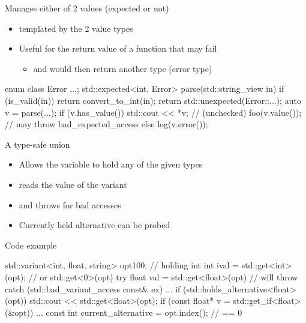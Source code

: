 \begin{frame}[fragile]
  \begin{block}{Manages either of 2 values (expected or not)}
    \begin{itemize}
    \item templated by the 2 value types
    \item Useful for the return value of a function that may fail
      \begin{itemize}
      \item and would then return another type (error type)
      \end{itemize}
    \end{itemize}
  \end{block}
  \begin{exampleblock}{}
    \small
    \begin{cppcode*}{}
      enum class Error {...};
      std::expected<int, Error> parse(std::string_view in) {
        if (is_valid(in)) return convert_to_int(in);
        return std::unexpected(Error::...);
      }
      auto v = parse(...);
      if (v.has_value()) {
        std::cout << *v; // (unchecked)
        foo(v.value());  // may throw bad_expected_access
      } else
        log(v.error());
    \end{cppcode*}
  \end{exampleblock}
\end{frame}

\begin{frame}[fragile]
  \begin{block}{A type-safe union}
    \begin{itemize}
    \item Allows the variable to hold any of the given types
    \item {} reads the value of the variant
    \item and throws  for bad accesses
    \item Currently held alternative can be probed
    \end{itemize}
  \end{block}
  \begin{exampleblock}{Code example}
    \small
    \begin{cppcode*}{}
      std::variant<int, float, string> opt{100}; // holding int
      int ival = std::get<int>(opt); // or std::get<0>(opt)
      try {
        float val = std::get<float>(opt) // will throw
      } catch (std::bad_variant_access const& ex) {...}
      if (std::holds_alternative<float>(opt))
          std::cout << std::get<float>(opt);
      if (const float* v = std::get_if<float>(&opt)) { ... }
      const int current_alternative = opt.index(); // == 0
    \end{cppcode*}
  \end{exampleblock}

\end{frame}

